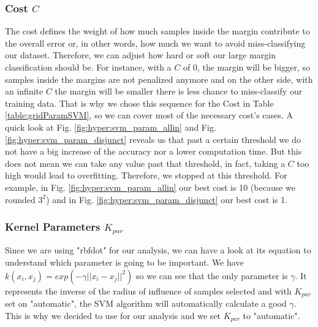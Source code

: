 \documentclass[conference]{IEEEtran}
\begin{document}
{    \subsubsection{Cost $C$}
    The cost defines the weight of how much samples inside the margin contribute to the overall error or, in other words, how much we want to avoid miss-classifying our dataset. Therefore, we can adjust how hard or soft our large margin classification should be.
    For instance, with a $C$ of 0, the margin will be bigger, so samples inside the margins are not penalized anymore and on the other side, with an infinite $C$ the margin will be smaller there is less chance to miss-classify our training data. That is why we chose this sequence for the Cost in Table \ref{table:gridParamSVM}, so we can cover most of the necessary cost's cases.
    A quick look at Fig. \ref{fig:hyper:svm_param_allin} and Fig. \ref{fig:hyper:svm_param_disjunct} reveals us that past a certain threshold we do not have a big increase of the accuracy nor a lower computation time. But this does not mean we can take any value past that threshold, in fact, taking a $C$ too high would lead to overfitting. Therefore, we stopped at this threshold. For example, in Fig. \ref{fig:hyper:svm_param_allin} our best cost is 10 (because we rounded $3^2$) and in Fig. \ref{fig:hyper:svm_param_disjunct} our best cost is 1.
    \subsubsection{Kernel Parameters $K_{par}$}
    Since we are using "rbfdot" for our analysis, we can have a look at its equation to understand which parameter is going to be important. We have \(k(x_{i},x_{j})=exp(-\gamma||x_{i}-x_{j}||^{2})\) so we can see that the only parameter is $\gamma$. It represents the inverse of the radius of influence of samples selected and with $K_{par}$ set on "automatic", the SVM algorithm will automatically calculate a good $\gamma$. This is why we decided to use for our analysis and we set $K_{par}$ to "automatic".}
\end{document}
